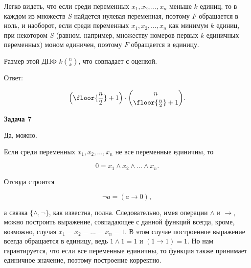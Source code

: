 			Легко видеть, что если среди переменных $x_1, x_2, \dots, x_n$ меньше $k$ единиц, то в каждом из множеств $S$ найдется нулевая переменная, поэтому $F$ обращается в ноль, и наоборот, если среди переменных $x_1, x_2, \dots, x_n$ как минимум $k$ единиц, при некотором $S$ (равном, например, множеству номеров первых $k$ единичных переменных) моном единичен, поэтому $F$ обращается в единицу.

			Размер этой ДНФ $k \binom{n}{k}$, что совпадает с оценкой.

		Ответ:

		\begin{equation*}
			\left( \floor{\frac{n}{2}} + 1 \right) \cdot \binom{n}{\floor{\frac{n}{2}} + 1}.
		\end{equation*}


	\begin{center}
    \textbf{Задача 7}
\end{center}
		Да, можно.

		Если среди переменных $x_1, x_2, \dots, x_n$ не все переменные единичны, то

		\begin{equation*}
			0 = x_1 \land x_2 \land \dots \land x_n.
		\end{equation*}

		Отсюда строится

		\begin{equation*}
			\neg a = (a \rightarrow 0),
		\end{equation*}

		а связка $\{\land, \neg\}$, как известна, полна. Следовательно, имея операции $\land$ и $\rightarrow$, можно построить выражение, совпадающее с данной функций всегда, кроме, возможно, случая $x_1 = x_2 = \dots = x_n = 1$. В этом случае построенное выражение всегда обращается в единицу, ведь $1 \land 1 = 1$ и $(1 \rightarrow 1) = 1$. Но нам гарантируется, что если все переменные единичны, то функция также принимает единичное значение, поэтому построение корректно.



